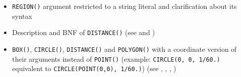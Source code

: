 \documentclass[11pt,a4paper]{ivoa}
\begin{document}
\begin{itemize}
\begin{itemize}
\begin{itemize}
                    \item \verb:REGION(): argument restricted to a string
                          literal and clarification about its syntax
                    \item Description and BNF of \verb:DISTANCE():
                          (see  and
                          )
                    \item \verb:BOX():, \verb:CIRCLE():, \verb:DISTANCE(): and
                          \verb:POLYGON(): with a coordinate version of their
                          arguments instead of \verb:POINT(): (example:
                          \verb:CIRCLE(0, 0, 1/60.): equivalent to
                          \verb:CIRCLE(POINT(0,0), 1/60.):)
                          (see ,
                          ,
                          ,
                          )
                \end{itemize}
        \end{itemize}
\end{itemize}

\clearpage %

\end{document}
